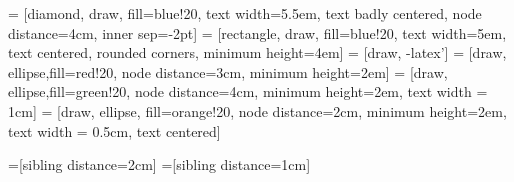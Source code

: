 \documentclass{article}
\begin{document}
\pagestyle{empty}


 = [diamond, draw, fill=blue!20, 
    text width=5.5em, text badly centered, node distance=4cm, inner sep=-2pt]
 = [rectangle, draw, fill=blue!20, 
    text width=5em, text centered, rounded corners, minimum height=4em]
 = [draw, -latex']
 = [draw, ellipse,fill=red!20, node distance=3cm,
    minimum height=2em]
 = [draw, ellipse,fill=green!20, node distance=4cm,
    minimum height=2em, text width = 1cm]
 = [draw, ellipse, fill=orange!20, node distance=2cm,
    minimum height=2em, text width = 0.5cm, text centered]

=[sibling distance=2cm]
=[sibling distance=1cm]
    
\end{document}
